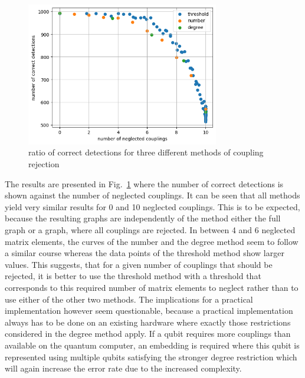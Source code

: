 \documentclass{article}
\begin{document}
\begin{figure}[h]
	\centering
	\includegraphics[width=0.75\textwidth]{img/method_comparison_correct_ratio.png}
	\caption{ratio of correct detections for three different methods of coupling rejection}
	\label{fig:method comparison correct ratio}
\end{figure}
The results are presented in Fig.~\ref{fig:method comparison correct ratio} where the number of correct detections is shown against the number of neglected couplings. It can be seen that all methods yield very similar results for 0 and 10 neglected couplings. This is to be expected, because the resulting graphs are independently of the method either the full graph or a graph, where all couplings are rejected. In between 4 and 6 neglected matrix elements, the curves of the number and the degree method seem to follow a similar course whereas the data points of the threshold method show larger values. This suggests, that for a given number of couplings that should be rejected, it is better to use the threshold method with a threshold that corresponds to this required number of matrix elements to neglect rather than to use either of the other two methods. The implications for a practical implementation however seem questionable, because a practical implementation always has to be done on an existing hardware where exactly those restrictions considered in the degree method apply. If a qubit requires more couplings than available on the quantum computer, an embedding is required where this qubit is represented using multiple qubits satisfying the stronger degree restriction which will again increase the error rate due to the increased complexity. 
\end{document}
